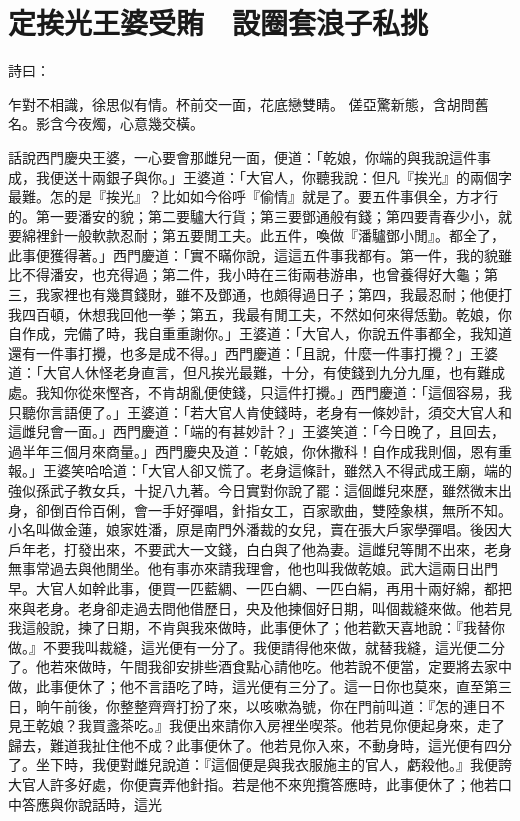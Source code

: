 %

\chapter{定挨光王婆受賄　設圈套浪子私挑}

\begin{showcontents}{}

詩曰：

乍對不相識，徐思似有情。杯前交一面，花底戀雙睛。
傞亞驚新態，含胡問舊名。影含今夜燭，心意幾交橫。

話說西門慶央王婆，一心要會那雌兒一面，便道：「乾娘，你端的與我說這件事成，我便送十兩銀子與你。」王婆道：「大官人，你聽我說：但凡『挨光』的兩個字最難。怎的是『挨光』？比如如今俗呼『偷情』就是了。要五件事俱全，方才行的。第一要潘安的貌；第二要驢大行貨；第三要鄧通般有錢；第四要青春少小，就要綿裡針一般軟款忍耐；第五要閒工夫。此五件，喚做『潘驢鄧小閒』。都全了，此事便獲得著。」西門慶道：「實不瞞你說，這這五件事我都有。第一件，我的貌雖比不得潘安，也充得過；第二件，我小時在三街兩巷游串，也曾養得好大龜；第三，我家裡也有幾貫錢財，雖不及鄧通，也頗得過日子；第四，我最忍耐；他便打我四百頓，休想我回他一拳；第五，我最有閒工夫，不然如何來得恁勤。乾娘，你自作成，完備了時，我自重重謝你。」王婆道：「大官人，你說五件事都全，我知道還有一件事打攪，也多是成不得。」西門慶道：「且說，什麼一件事打攪？」王婆道：「大官人休怪老身直言，但凡挨光最難，十分，有使錢到九分九厘，也有難成處。我知你從來慳吝，不肯胡亂便使錢，只這件打攪。」西門慶道：「這個容易，我只聽你言語便了。」王婆道：「若大官人肯使錢時，老身有一條妙計，須交大官人和這雌兒會一面。」西門慶道：「端的有甚妙計？」王婆笑道：「今日晚了，且回去，過半年三個月來商量。」西門慶央及道：「乾娘，你休撒科！自作成我則個，恩有重報。」王婆笑哈哈道：「大官人卻又慌了。老身這條計，雖然入不得武成王廟，端的強似孫武子教女兵，十捉八九著。今日實對你說了罷：這個雌兒來歷，雖然微末出身，卻倒百伶百俐，會一手好彈唱，針指女工，百家歌曲，雙陸象棋，無所不知。小名叫做金蓮，娘家姓潘，原是南門外潘裁的女兒，賣在張大戶家學彈唱。後因大戶年老，打發出來，不要武大一文錢，白白與了他為妻。這雌兒等閒不出來，老身無事常過去與他閒坐。他有事亦來請我理會，他也叫我做乾娘。武大這兩日出門早。大官人如幹此事，便買一匹藍綢、一匹白綢、一匹白絹，再用十兩好綿，都把來與老身。老身卻走過去問他借歷日，央及他揀個好日期，叫個裁縫來做。他若見我這般說，揀了日期，不肯與我來做時，此事便休了；他若歡天喜地說：『我替你做。』不要我叫裁縫，這光便有一分了。我便請得他來做，就替我縫，這光便二分了。他若來做時，午間我卻安排些酒食點心請他吃。他若說不便當，定要將去家中做，此事便休了；他不言語吃了時，這光便有三分了。這一日你也莫來，直至第三日，晌午前後，你整整齊齊打扮了來，以咳嗽為號，你在門前叫道：『怎的連日不見王乾娘？我買盞茶吃。』我便出來請你入房裡坐喫茶。他若見你便起身來，走了歸去，難道我扯住他不成？此事便休了。他若見你入來，不動身時，這光便有四分了。坐下時，我便對雌兒說道：『這個便是與我衣服施主的官人，虧殺他。』我便誇大官人許多好處，你便賣弄他針指。若是他不來兜攬答應時，此事便休了；他若口中答應與你說話時，這光
\end{showcontents}

